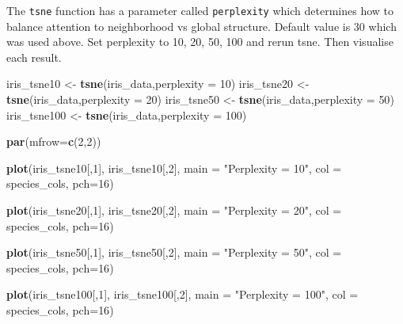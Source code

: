 \documentclass[
]{book}
\newenvironment{Shaded}{\begin{snugshade}}{\end{snugshade}}
\newcommand{\AttributeTok}[1]{\textcolor[rgb]{0.13,0.29,0.53}{#1}}
\newcommand{\DecValTok}[1]{\textcolor[rgb]{0.00,0.00,0.81}{#1}}
\newcommand{\FunctionTok}[1]{\textcolor[rgb]{0.13,0.29,0.53}{\textbf{#1}}}
\newcommand{\NormalTok}[1]{#1}
\newcommand{\OtherTok}[1]{\textcolor[rgb]{0.56,0.35,0.01}{#1}}
\newcommand{\StringTok}[1]{\textcolor[rgb]{0.31,0.60,0.02}{#1}}
\begin{document}
The \texttt{tsne} function has a parameter called \texttt{perplexity} which determines how to balance attention to neighborhood vs global structure. Default value is 30 which was used above. Set perplexity to 10, 20, 50, 100 and rerun tsne. Then visualise each result.

\begin{Shaded}
\begin{Highlighting}[]
\NormalTok{iris\_tsne10 }\OtherTok{\textless{}{-}} \FunctionTok{tsne}\NormalTok{(iris\_data,}\AttributeTok{perplexity =} \DecValTok{10}\NormalTok{)}
\NormalTok{iris\_tsne20 }\OtherTok{\textless{}{-}} \FunctionTok{tsne}\NormalTok{(iris\_data,}\AttributeTok{perplexity =} \DecValTok{20}\NormalTok{)}
\NormalTok{iris\_tsne50 }\OtherTok{\textless{}{-}} \FunctionTok{tsne}\NormalTok{(iris\_data,}\AttributeTok{perplexity =} \DecValTok{50}\NormalTok{)}
\NormalTok{iris\_tsne100 }\OtherTok{\textless{}{-}} \FunctionTok{tsne}\NormalTok{(iris\_data,}\AttributeTok{perplexity =} \DecValTok{100}\NormalTok{)}
\end{Highlighting}
\end{Shaded}

\begin{Shaded}
\begin{Highlighting}[]
\FunctionTok{par}\NormalTok{(}\AttributeTok{mfrow=}\FunctionTok{c}\NormalTok{(}\DecValTok{2}\NormalTok{,}\DecValTok{2}\NormalTok{))}

\FunctionTok{plot}\NormalTok{(iris\_tsne10[,}\DecValTok{1}\NormalTok{],}
\NormalTok{     iris\_tsne10[,}\DecValTok{2}\NormalTok{],}
     \AttributeTok{main =} \StringTok{"Perplexity = 10"}\NormalTok{,}
     \AttributeTok{col =}\NormalTok{ species\_cols,}
     \AttributeTok{pch=}\DecValTok{16}\NormalTok{)}

\FunctionTok{plot}\NormalTok{(iris\_tsne20[,}\DecValTok{1}\NormalTok{],}
\NormalTok{     iris\_tsne20[,}\DecValTok{2}\NormalTok{],}
     \AttributeTok{main =} \StringTok{"Perplexity = 20"}\NormalTok{,}
     \AttributeTok{col =}\NormalTok{ species\_cols,}
     \AttributeTok{pch=}\DecValTok{16}\NormalTok{)}

\FunctionTok{plot}\NormalTok{(iris\_tsne50[,}\DecValTok{1}\NormalTok{],}
\NormalTok{     iris\_tsne50[,}\DecValTok{2}\NormalTok{],}
     \AttributeTok{main =} \StringTok{"Perplexity = 50"}\NormalTok{,}
     \AttributeTok{col =}\NormalTok{ species\_cols,}
     \AttributeTok{pch=}\DecValTok{16}\NormalTok{)}

\FunctionTok{plot}\NormalTok{(iris\_tsne100[,}\DecValTok{1}\NormalTok{],}
\NormalTok{     iris\_tsne100[,}\DecValTok{2}\NormalTok{],}
     \AttributeTok{main =} \StringTok{"Perplexity = 100"}\NormalTok{,}
     \AttributeTok{col =}\NormalTok{ species\_cols,}
     \AttributeTok{pch=}\DecValTok{16}\NormalTok{)}
\end{Highlighting}
\end{Shaded}
\end{document}
